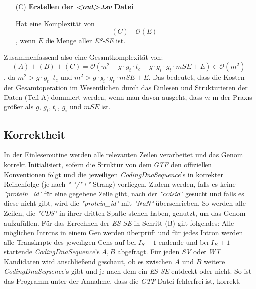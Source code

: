 \documentclass[12pt]{article}
\begin{document}
\begin{enumerate}
	\item[(C)] \textbf{Erstellen der \textit{<out>.tsv} Datei}

		Hat eine Komplexität von
		\begin{equation}
			(C) \hspace{1em} \mathcal{O}(E)
		\end{equation}
		, wenn $E$ die Menge aller \textit{ES-SE} ist.
\end{enumerate}

Zusammenfassend also eine Gesamtkomplexität von:
\begin{equation}
	(A) + (B) + (C) = \mathcal{O}( m^{2} + g \cdot g_{t} \cdot t_{c} + g \cdot g_{i} \cdot g_{t} \cdot mSE + E) \in \mathcal{O}(m^{2})
\end{equation}
, da $m^{2} > g \cdot g_{t} \cdot t_{c}$ und $m^{2} > g \cdot g_{i} \cdot g_{t} \cdot mSE + E$.
Das bedeutet, dass die Kosten der Gesamtoperation im Wesentlichen durch das Einlesen und Strukturieren der Daten (Teil A) dominiert werden,
wenn man davon ausgeht, dass $m$ in der Praxis größer als $g$, $g_{t}$, $t_{c}$, $g_{i}$ und $mSE$ ist.


\subsection{Korrektheit}
In der Einleseroutine werden alle relevanten Zeilen verarbeitet und das Genom
korrekt Initialisiert, sofern die Struktur von dem \textit{GTF} den \href{https://asia.ensembl.org/info/website/upload/gff.html}{offiziellen Konventionen} folgt und die jeweiligen
\textit{CodingDnaSequence}'s in korrekter Reihenfolge (je nach \textit{"-"/"+"} Strang) vorliegen.
Zudem werden, falls es keine \textit{"protein\_id"} für eine gegebene Zeile gibt, nach der
\textit{"ccdsid"} gesucht und falls es diese nicht gibt, wird die \textit{"protein\_id"}
mit \textit{"NaN"} überschrieben. So werden alle Zeilen, die \textit{"CDS"} in ihrer
dritten Spalte stehen haben, genutzt, um das Genom aufzufüllen.
Für das Errechnen der \textit{ES-SE} in Schritt (B) gilt folgendes:
Alle möglichen Introns in einem Gen werden überprüft und für jedes Intron
werden alle Transkripte des jeweiligen Gens auf bei $I_{S} - 1$ endende  und
bei $I_{E} + 1$ startende \textit{CodingDnaSequence}'s $A, B$ abgefragt. Für
jeden \textit{SV} oder \textit{WT} Kandidaten wird anschlie\ss end geschaut,
ob es zwischen $A$ und $B$ weitere \textit{CodingDnaSequence}'s gibt und
je nach dem ein \textit{ES-SE} entdeckt oder nicht.
So ist das Programm unter der Annahme, dass die \textit{GTF}-Datei fehlerfrei ist, korrekt.
\end{document}
